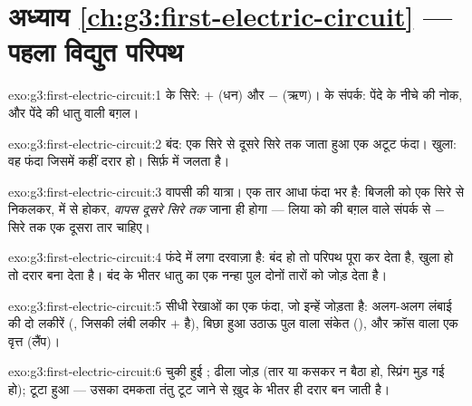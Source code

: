 \section*{अध्याय \ref{ch:g3:first-electric-circuit} --- पहला विद्युत परिपथ}

\begin{solution}{exo:g3:first-electric-circuit:1}
 के सिरे: $+$ (धन) और $-$ (ऋण)।  के संपर्क: पेंदे के नीचे
की नोक, और पेंदे की धातु वाली बग़ल।
\end{solution}

\begin{solution}{exo:g3:first-electric-circuit:2}
बंद: एक सिरे से दूसरे सिरे तक जाता हुआ एक अटूट फंदा। खुला: वह फंदा
जिसमें कहीं दरार हो।  सिर्फ़  में जलता है।
\end{solution}

\begin{solution}{exo:g3:first-electric-circuit:3}
वापसी की यात्रा। एक तार आधा फंदा भर है: बिजली को एक सिरे से निकलकर,
 में से होकर, \emph{वापस दूसरे सिरे तक} जाना ही होगा --- लिया को
 की बग़ल वाले संपर्क से $-$ सिरे तक एक दूसरा तार चाहिए।
\end{solution}

\begin{solution}{exo:g3:first-electric-circuit:4}
 फंदे में लगा दरवाज़ा है: बंद हो तो परिपथ पूरा कर देता है, खुला
हो तो दरार बना देता है। बंद  के भीतर धातु का एक नन्हा पुल दोनों
तारों को जोड़ देता है।
\end{solution}

\begin{solution}{exo:g3:first-electric-circuit:5}
सीधी रेखाओं का एक फंदा, जो इन्हें जोड़ता है: अलग-अलग लंबाई की दो
लकीरें (, जिसकी लंबी लकीर $+$ है), बिछा हुआ उठाऊ पुल वाला संकेत
(), और क्रॉस वाला एक वृत्त (लैंप)।
\end{solution}

\begin{solution}{exo:g3:first-electric-circuit:6}
चुकी हुई ; ढीला जोड़ (तार या  कसकर न बैठा हो, स्प्रिंग मुड़
गई हो); टूटा हुआ  --- उसका दमकता तंतु टूट जाने से ख़ुद  के
भीतर ही दरार बन जाती है।
\end{solution}

